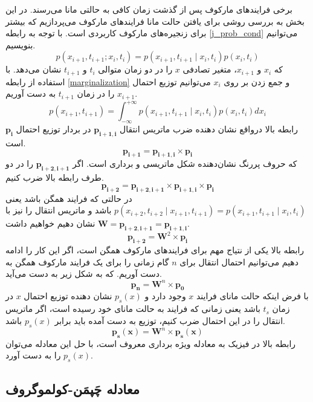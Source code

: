 برخی فرایندهای مارکوف پس از گذشت زمان کافی به حالتی مانا می‌رسند.
در این بخش به بررسی روشی برای یافتن حالت مانا فرایندهای مارکوف می‌پردازیم که بیشتر برای زنجیره‌های مارکوف کاربردی است.
با توجه به رابطه \ref{j_prob_cond} می‌توانیم بنویسیم.
$$
  p(x_{i+1},t_{i+1};x_{i}, t_{i}) = p(x_{i+1},t_{i+1} \mid x_{i}, t_{i}) p(x_{i},t_{i})
$$
که $x_i$ و $x_{i+1}$، متغیر تصادفی $x$ را در دو زمان متوالی $t_i$ و $t_{i+1}$ نشان می‌دهد. با استفاده از رابطه \ref{marginalization} و جمع زدن بر روی $x_i$ می‌توانیم توزیع احتمال $x_{i+1}$ را در زمان $t_{i+1}$ به دست آوریم.
\begin{equation}
  p(x_{i+1},t_{i+1}) = \int_{-\infty}^{+\infty} p(x_{i+1},t_{i+1} \mid x_{i}, t_{i}) p(x_{i},t_{i}) d x_{i}
  \label{transition_multip}
\end{equation}
رابطه بالا در‌واقع نشان دهنده ضرب ماتریس انتقال $\mathbf{p_{i+1,i}}$ در بردار توزیع احتمال $\mathbf{p_i}$ است.
$$
  \mathbf{p_{i+1}} = \mathbf{p_{i+1,i}} \times \mathbf{p_i}
$$
که حروف پررنگ نشان‌دهنده شکل ماتریسی و برداری است.
اگر $\mathbf{p_{i+2,i+1}}$ را در دو طرف رابطه بالا ضرب کنیم.
$$
  \mathbf{p_{i+2}} = \mathbf{p_{i+2,i+1}} \times \mathbf{p_{i+1,i}} \times \mathbf{p_i}
$$
در حالتی که فرایند همگن باشد یعنی $p(x_{i+2}, t_{i+2} \mid x_{i+1},t_{i+1})=p(x_{i+1},t_{i+1} \mid x_{i}, t_{i})$ باشد و ماتریس انتقال را نیز با $\mathbf{W}=\mathbf{p_{i+2,i+1}} = \mathbf{p_{i+1,i}}$ نشان دهیم خواهیم داشت.
$$
  \mathbf{p_{i+2}} = \mathbf{W}^{2} \times \mathbf{p_{i}}
$$
رابطه بالا یکی از نتیاج مهم برای فرایندهای مارکوف همگن است، اگر این کار را ادامه دهیم می‌توانیم احتمال انتقال برای $n$ گام زمانی را برای یک فرایند مارکوف همگن به دست آوریم. که به شکل زیر به دست می‌آید.
\begin{equation}
    \mathbf{p_{n}} = \mathbf{W}^{n} \times \mathbf{p_{0}}
    \label{nstep_transition}
\end{equation}
با فرض اینکه حالت مانای فرایند $x$ وجود دارد و $p_{s}(x)$ نشان دهنده توزیع احتمال $x$ در زمان $t_s$ باشد یعنی زمانی که فرایند به حالت مانای خود رسیده است، اگر ماتریس انتقال را در این احتمال ضرب کنیم، توزیع به دست آمده باید برابر $p_{s}(x)$ باشد.\cite{bremaud_markov_1999}
$$
\mathbf{p_{s}(x)} = \mathbf{W}^{n} \times \mathbf{p_{s}(x)}
$$
رابطه بالا در فیزیک به معادله ویژه برداری معروف است، با حل این معادله می‌توان $p_{s}(x)$ را به دست آورد.

\subsection{معادله چَپمَن-کولموگروف}


